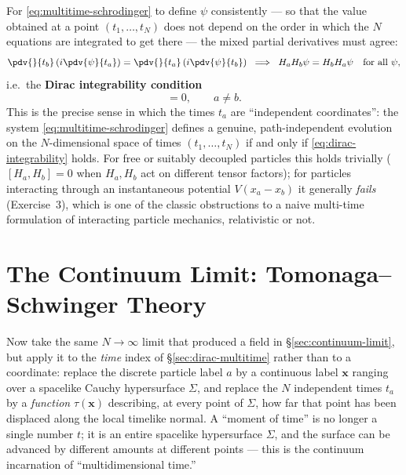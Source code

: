 For \eqref{eq:multitime-schrodinger} to define $\psi$ consistently --- so that
the value obtained at a point $(t_1,\dots,t_N)$ does not depend on the order in
which the $N$ equations are integrated to get there --- the mixed partial
derivatives must agree:
\begin{equation}
\pdv{}{t_b}\left(i\pdv{\psi}{t_a}\right) = \pdv{}{t_a}\left(i\pdv{\psi}{t_b}\right)
\;\;\Longrightarrow\;\;
H_aH_b\psi = H_bH_a\psi \quad \text{for all }\psi,
\end{equation}
i.e.\ the \textbf{Dirac integrability condition}
\begin{equation}
[H_a,H_b]=0, \qquad a\neq b.
\label{eq:dirac-integrability}
\end{equation}
This is the precise sense in which the times $t_a$ are ``independent
coordinates'': the system \eqref{eq:multitime-schrodinger} defines a genuine,
path-independent evolution on the $N$-dimensional space of times
$(t_1,\dots,t_N)$ if and only if \eqref{eq:dirac-integrability} holds. For free
or suitably decoupled particles this holds trivially ($[H_a,H_b]=0$ when
$H_a,H_b$ act on different tensor factors); for particles interacting through
an instantaneous potential $V(x_a-x_b)$ it generally \emph{fails} (Exercise~3),
which is one of the classic obstructions to a naive multi-time formulation of
interacting particle mechanics, relativistic or not.

\section{The Continuum Limit: Tomonaga--Schwinger Theory}
\label{sec:tomonaga-schwinger}

Now take the same $N\to\infty$ limit that produced a field in
\S\ref{sec:continuum-limit}, but apply it to the \emph{time} index of
\S\ref{sec:dirac-multitime} rather than to a coordinate: replace the discrete
particle label $a$ by a continuous label $\mathbf{x}$ ranging over a spacelike
Cauchy hypersurface $\Sigma$, and replace the $N$ independent times $t_a$ by a
\emph{function} $\tau(\mathbf{x})$ describing, at every point of $\Sigma$, how
far that point has been displaced along the local timelike normal. A ``moment
of time'' is no longer a single number $t$; it is an entire spacelike
hypersurface $\Sigma$, and the surface can be advanced by different amounts at
different points --- this is the continuum incarnation of ``multidimensional
time.''


